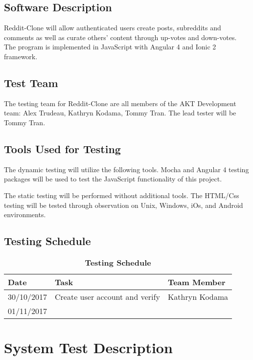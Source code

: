 \documentclass[12pt,fleqn]{article}
\begin{document}
\subsection {Software Description}
Reddit-Clone will allow authenticated users create posts, subreddits and comments as well as curate others' content through up-votes and down-votes.  The program is implemented in JavaScript with Angular 4 and Ionic 2 framework.

\subsection {Test Team}
The testing team for Reddit-Clone are all members of the AKT Development team: Alex Trudeau, Kathryn Kodama, Tommy Tran.  The lead tester will be Tommy Tran.

\subsection {Tools Used for Testing}
The dynamic testing will utilize the following tools.  Mocha and Angular 4 testing packages will be used to test the JavaScript functionality of this project.

The static testing will be performed without additional tools.  The HTML/Css testing will be tested through observation on Unix, Windows, iOs, and Android environments.

\subsection {Testing Schedule}

\begin{table}[h]
\caption{\textbf{Testing Schedule}} \label{Schedule}

\begin{tabularx}{\textwidth}{p{4cm}XX}
\toprule
\textbf{Date} & \textbf{Task} & \textbf{Team Member} \\
\midrule
30/10/2017 & Create user account and verify & Kathryn Kodama \\
01/11/2017 &  & \\

\bottomrule
\end{tabularx}

\end{table}


\pagebreak
\section{System Test Description}
\end{document}
